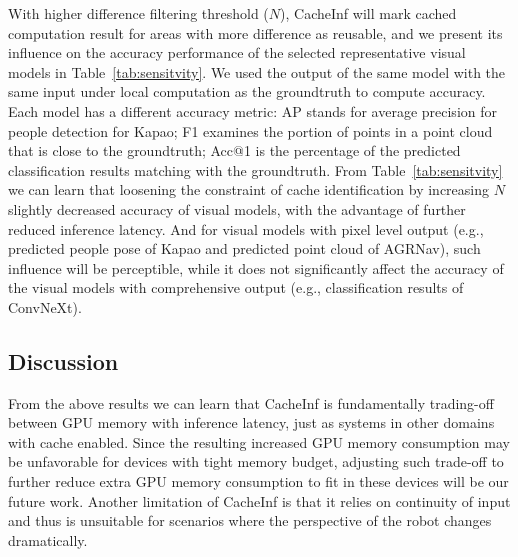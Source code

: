 With higher difference filtering threshold ($N$), CacheInf will mark cached computation result for areas with more difference as reusable, and we present its influence on the accuracy performance of the selected representative visual models in Table~\ref{tab:sensitvity}.
We used the output of the same model with the same input under local computation as the groundtruth to compute accuracy.
Each model has a different accuracy metric: AP stands for average precision for people detection for Kapao; F1 examines the portion of points in a point cloud that is close to the groundtruth; Acc@1 is the percentage of the predicted classification results matching with the groundtruth.
From Table~\ref{tab:sensitvity} we can learn that loosening the constraint of cache identification by increasing $N$ slightly decreased accuracy of visual models, with the advantage of further reduced inference latency.
And for visual models with pixel level output (e.g., predicted people pose of Kapao and predicted point cloud of AGRNav), such influence will be perceptible, while it does not significantly affect the accuracy of the visual models with comprehensive output (e.g., classification results of ConvNeXt).







\subsection{Discussion}
From the above results we can learn that CacheInf is fundamentally trading-off between GPU memory with inference latency, just as systems in other domains with cache enabled.
Since the resulting increased GPU memory consumption may be unfavorable for devices with tight memory budget, adjusting such trade-off to further reduce extra GPU memory consumption to fit in these devices will be our future work.
Another limitation of CacheInf is that it relies on continuity of input and thus is unsuitable for scenarios where the perspective of the robot changes dramatically.